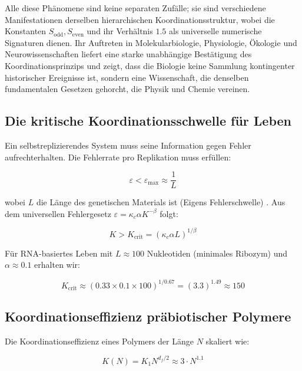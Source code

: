 \documentclass[12pt,a4paper]{article}
\theoremstyle{remark}
\newcommand{\kappac}{\kappa_c}
\newcommand{\eps}{\varepsilon}
\newcommand{\df}{d_{\!f}}
\begin{document}
	Alle diese Phänomene sind keine separaten Zufälle; sie sind verschiedene Manifestationen derselben hierarchischen Koordinationsstruktur, wobei die Konstanten $S_{\mathrm{odd}}, S_{\mathrm{even}}$ und ihr Verhältnis $1.5$ als universelle numerische Signaturen dienen. Ihr Auftreten in Molekularbiologie, Physiologie, Ökologie und Neurowissenschaften liefert eine starke unabhängige Bestätigung des Koordinationsprinzips und zeigt, dass die Biologie keine Sammlung kontingenter historischer Ereignisse ist, sondern eine Wissenschaft, die denselben fundamentalen Gesetzen gehorcht, die Physik und Chemie vereinen.
	
	\subsection{Die kritische Koordinationsschwelle für Leben}
	
	Ein selbstreplizierendes System muss seine Information gegen Fehler aufrechterhalten. Die Fehlerrate pro Replikation muss erfüllen:
	
	\begin{equation}
		\eps < \eps_{\text{max}} \approx \frac{1}{L}
		\label{eq:error-threshold}
	\end{equation}
	
	wobei $L$ die Länge des genetischen Materials ist (Eigens Fehlerschwelle) \cite{Eigen1971}. Aus dem universellen Fehlergesetz $\eps = \kappac \alpha K^{-\beta}$ folgt:
	
	\begin{equation}
		K > K_{\text{crit}} = \left( \kappac \alpha L \right)^{1/\beta}
		\label{eq:Kcrit-life}
	\end{equation}
	
	Für RNA-basiertes Leben mit $L \approx 100$ Nukleotiden (minimales Ribozym) und $\alpha \approx 0.1$ erhalten wir:
	
	\begin{equation}
		K_{\text{crit}} \approx (0.33 \times 0.1 \times 100)^{1/0.67} = (3.3)^{1.49} \approx 150
		\label{eq:Kcrit-life-num}
	\end{equation}
	
	\subsection{Koordinationseffizienz präbiotischer Polymere}
	
	Die Koordinationseffizienz eines Polymers der Länge $N$ skaliert wie:
	
	\begin{equation}
		K(N) = K_1 N^{\df/2} \approx 3 \cdot N^{1.1}
		\label{eq:K-polymer}
	\end{equation}
	
\end{document}
